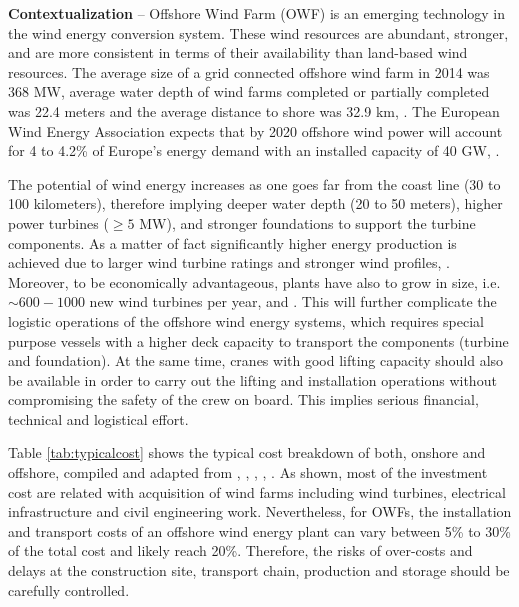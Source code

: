 \textbf{Contextualization} --
Offshore Wind Farm (OWF) is an emerging technology in the wind energy conversion system. These wind resources are abundant, stronger, and are more consistent in terms of their availability than land-based wind resources. The average size of a grid connected offshore wind farm in 2014 was 368 MW, average water depth of wind farms completed or partially completed was 22.4 meters and the average distance to shore was 32.9 km, \cite{Giorgio2015}. The European Wind Energy Association expects that by 2020 offshore wind power will account for 4 to 4.2\% of Europe's energy demand with an installed capacity of 40 GW, \cite{EWEA2011, Kaldellis2013}.

The potential of wind energy increases as one goes far from the coast line (30 to 100 kilometers), therefore implying deeper water depth (20 to 50 meters), higher power turbines ($\geq 5$ MW), and stronger foundations to support the turbine components. As a matter of fact significantly higher energy production is achieved due to larger wind turbine ratings and stronger wind profiles, \cite{Sun2012298}. Moreover, to be economically advantageous, plants have also to grow in size, i.e. $\sim600-1000$ new wind turbines per year, \cite{EWEA2011} and \cite{Kaldellis2013}. This will further complicate the logistic operations of the offshore wind energy systems, which requires special purpose vessels with a higher deck capacity to transport the components (turbine and foundation). At the same time, cranes with good lifting capacity should also be available in order to carry out the lifting and installation operations without compromising the safety of the crew on board. This implies serious financial, technical and logistical effort.

Table \ref{tab:typicalcost} shows the typical cost breakdown of both, onshore and offshore, compiled and adapted from \cite{Henderson2003}, \cite{Junginger2004}, \cite{UK10}, \cite{TCE12}, \cite{IRENA12}. As shown, most of the investment cost are related with acquisition of wind farms including wind turbines, electrical infrastructure and civil engineering work. Nevertheless, for OWFs, the installation and transport costs of an offshore wind energy plant can vary between 5\% to 30\% of the total cost and likely reach 20\%. Therefore, the risks of over-costs and delays at the construction site, transport chain, production and storage should be carefully controlled.
